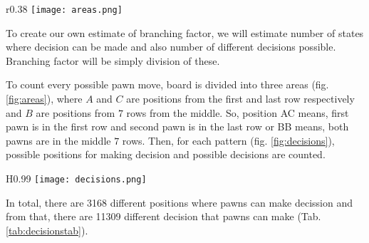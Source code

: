 \begin{wrapfigure}{r}{0.38\textwidth}
  \vspace*{-0.45cm}
  \centering
  \texttt{[image: areas.png]}
  \vspace*{-0.30cm}
  \caption{board areas}
  \label{fig:areas}
  \vspace*{-0.60cm}
\end{wrapfigure}

To create our own estimate of branching factor, we will estimate number
of states where decision can be made and also number of different decisions
possible. Branching factor will be simply division of these.

To count every possible pawn move, board is divided into three areas
(fig. \ref{fig:areas}), where $A$ and $C$ are positions from the first
and last row respectively and $B$ are positions from $7$ rows from the middle.
So, position AC means, first pawn is in the first row and second pawn is
in the last row or BB means, both pawns are in the middle $7$ rows. Then, for
each pattern (fig. \ref{fig:decisions}), possible positions for making
decision and possible decisions are counted.

\begin{wrapfigure}{H}{0.99\textwidth}
  \vspace*{-12.60cm}
  \centering
  \texttt{[image: decisions.png]}
  \vspace*{-0.25cm}
  \caption{decision patterns}
  \label{fig:decisions}
  \vspace*{-0.60cm}
\end{wrapfigure}

\vspace{12.00cm}
\nobreakspace
In total, there are 3168 different positions where pawns can make decission and
from that, there are 11309 different decision that pawns can make
(Tab. \ref{tab:decisionstab}).
\newpage

\newcommand{\m}[2]{\multicolumn{1}{|#1}{#2}}
\newcommand{\rr}[6]{
  \m{l}{#1} & \m{r}{#2} & \m{r|}{#3} & & \m{l}{#4} & \m{r}{#5} & \m{r|}{#6} \\
}

